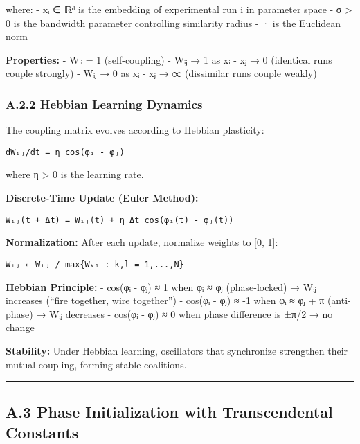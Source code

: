 \documentclass[
]{article}
\begin{document}
where: - xᵢ ∈ ℝᵈ is the embedding of experimental run i in parameter
space - σ \textgreater{} 0 is the bandwidth parameter controlling
similarity radius - \textbar\textbar·\textbar\textbar{} is the Euclidean
norm

\textbf{Properties:} - Wᵢᵢ = 1 (self-coupling) - Wᵢⱼ → 1 as
\textbar\textbar xᵢ - xⱼ\textbar\textbar{} → 0 (identical runs couple
strongly) - Wᵢⱼ → 0 as \textbar\textbar xᵢ - xⱼ\textbar\textbar{} → ∞
(dissimilar runs couple weakly)

\subsubsection{A.2.2 Hebbian Learning
Dynamics}\label{a.2.2-hebbian-learning-dynamics}

The coupling matrix evolves according to Hebbian plasticity:

\begin{verbatim}
dWᵢⱼ/dt = η cos(φᵢ - φⱼ)
\end{verbatim}

where η \textgreater{} 0 is the learning rate.

\textbf{Discrete-Time Update (Euler Method):}

\begin{verbatim}
Wᵢⱼ(t + Δt) = Wᵢⱼ(t) + η Δt cos(φᵢ(t) - φⱼ(t))
\end{verbatim}

\textbf{Normalization:} After each update, normalize weights to {[}0,
1{]}:

\begin{verbatim}
Wᵢⱼ ← Wᵢⱼ / max{Wₖₗ : k,l = 1,...,N}
\end{verbatim}

\textbf{Hebbian Principle:} - cos(φᵢ - φⱼ) ≈ 1 when φᵢ ≈ φⱼ
(phase-locked) → Wᵢⱼ increases (``fire together, wire together'') -
cos(φᵢ - φⱼ) ≈ -1 when φᵢ ≈ φⱼ + π (anti-phase) → Wᵢⱼ decreases - cos(φᵢ
- φⱼ) ≈ 0 when phase difference is ±π/2 → no change

\textbf{Stability:} Under Hebbian learning, oscillators that synchronize
strengthen their mutual coupling, forming stable coalitions.

\begin{center}\rule{0.5\linewidth}{0.5pt}\end{center}

\subsection{A.3 Phase Initialization with Transcendental
Constants}\label{a.3-phase-initialization-with-transcendental-constants}
\end{document}
